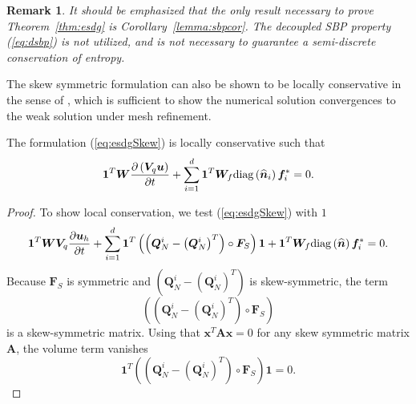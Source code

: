 \documentclass[review]{siamart0216}
\newtheorem*{remark}{Remark}
\theoremstyle{assumption}
\renewcommand{\hat}[1]{\hat{#1}}
\newcommand{\pd}[2]{\frac{\partial#1}{\partial#2}}
\newcommand{\LRp}[1]{\left( #1 \right)}
\renewcommand{\hat}{\widehat}
\newcommand{\diag}[1]{{\rm diag}\LRp{#1}}
\begin{document}
\begin{remark}
It should be emphasized that the only result necessary to prove Theorem~\ref{thm:esdg} is Corollary~\ref{lemma:sbpcor}.  The decoupled SBP property (\ref{eq:dsbp}) is not utilized, and is not necessary to guarantee a semi-discrete conservation of entropy.  
\end{remark}

The skew symmetric formulation can also be shown to be locally conservative in the sense of \cite{shi2017local}, which is sufficient to show the numerical solution convergences to the weak solution under mesh refinement.  
\begin{theorem}
The formulation (\ref{eq:esdgSkew}) is locally conservative such that
\begin{align}
\bm{1}^T\bm{W}\pd{\LRp{\bm{V}_q\bm{u}}}{t} + \sum_{i=1}^d\bm{1}^T\bm{W}_f \diag{\hat{\bm{n}}_i}\bm{f}_i^* = 0. 
\end{align}
\end{theorem}
\begin{proof}
To show local conservation, we test (\ref{eq:esdgSkew}) with $1$
\begin{align}
\bm{1}^T\bm{W}\bm{V}_q\pd{\bm{u}_h}{t} + \sum_{i=1}^d
\bm{1}^T
\LRp{\LRp{\bm{Q}^i_N - \LRp{\bm{Q}^i_N}^T} \circ \bm{F}_S}\bm{1} + \bm{1}^T\bm{W}_f \diag{\hat{\bm{n}}}\bm{f}_i^* = 0. 
\end{align}
Because $\bm{F}_S$ is symmetric and $\LRp{\bm{Q}^i_N - \LRp{\bm{Q}^i_N}^T}$ is skew-symmetric, the term 
\[
\LRp{\LRp{\bm{Q}^i_N - \LRp{\bm{Q}^i_N}^T} \circ \bm{F}_S}
\]
is a skew-symmetric matrix.  Using that $\bm{x}^T\bm{A}\bm{x} = 0$ for any skew symmetric matrix $\bm{A}$, the volume term vanishes
\[
\bm{1}^T\LRp{\LRp{\bm{Q}^i_N - \LRp{\bm{Q}^i_N}^T} \circ \bm{F}_S}\bm{1} = 0.
\]
\end{proof}
\end{document}
